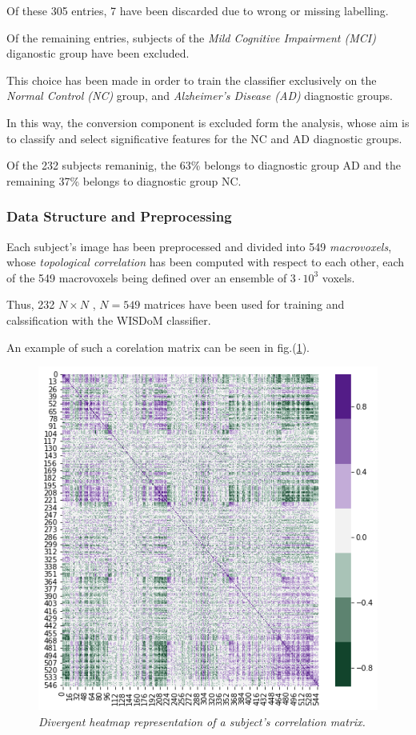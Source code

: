 \documentclass[12pt,openright,twoside,a4paper]{book}
\begin{document}
Of these 305 entries, 7 have been discarded due to wrong or missing labelling.

Of the remaining entries, subjects of the \textit{Mild Cognitive Impairment (MCI)} diganostic group have been excluded.

This choice has been made in order to train the classifier exclusively on the \textit{Normal Control (NC)} group, and \textit{Alzheimer's Disease (AD)} diagnostic groups.

In this way, the conversion component is excluded form the analysis, whose aim is to classify and select significative features for the NC and AD diagnostic groups.

Of the 232 subjects remaninig, the 63\% belongs to diagnostic group AD and the remaining 37\% belongs to diagnostic group NC.

\subsubsection*{Data Structure and Preprocessing}

Each subject's image has been preprocessed and divided into 549 \textit{macrovoxels}, whose \textit{topological correlation} has been computed with respect to each other, each of the 549 macrovoxels being defined over an ensemble of $3 \cdot 10^3$ voxels.

Thus, 232 $N\times N$ , $N=549$ matrices have been used for training and calssification with the WISDoM classifier.

An example of such a corelation matrix can be seen in fig.(\ref{sample-heat}).

\begin{figure}[!h]
\centering
\includegraphics[scale=0.5]{sample-heat}
\caption{\textit{Divergent heatmap representation of a subject's correlation matrix.}}
\label{sample-heat}
\end{figure}
\end{document}
